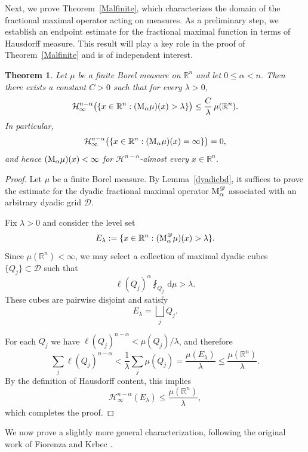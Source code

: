 \documentclass[11pt, a4paper, reqno]{amsart}
\newcommand{\R}{\mathbb R}
\newcommand{\Dy}{\mathscr D}
\newcommand{\Haus}{\mathcal H }
\newcommand{\dmu}{\,{\mathrm d\mu}}
\newtheorem{theorem}{Theorem}[section]
\theoremstyle{definition}
\theoremstyle{remark}
\begin{document}
Next, we prove Theorem~\ref{Malfinite}, which characterizes the domain of the fractional maximal operator acting on measures. As a preliminary step, we establish an endpoint estimate for the fractional maximal function in terms of Hausdorff measure. This result will play a key role in the proof of Theorem~\ref{Malfinite} and is of independent interest.

\begin{theorem}\label{weakHaus}
Let $\mu$ be a finite Borel measure on $\R^n$ and let $0 \le \alpha < n$. Then there exists a constant $C>0$ such that for every $\lambda>0$,
\[
\Haus_\infty^{n-\alpha}\bigl(\{x \in \R^n : (\textup{M}_\alpha \mu)(x) > \lambda\}\bigr)
\le \frac{C}{\lambda}\,\mu(\R^n).
\]
In particular,
\[
\Haus_\infty^{n-\alpha}\bigl(\{x \in \R^n : (\textup{M}_\alpha \mu)(x) = \infty\}\bigr) = 0,
\]
and hence $(\textup{M}_\alpha \mu)(x) < \infty$ for $\Haus^{n-\alpha}$-almost every $x \in \R^n$.
\end{theorem}



\begin{proof}
Let $\mu$ be a finite Borel measure. By Lemma~\ref{dyadicbd}, it suffices to prove the estimate for the dyadic fractional maximal operator $\textup{M}_\alpha^{\Dy}$ associated with an arbitrary dyadic grid $\Dy$.

Fix $\lambda>0$ and consider the level set
\[
E_\lambda := \{x\in\R^n : (\textup{M}_\alpha^{\Dy}\mu)(x) > \lambda\}.
\]
Since $\mu(\R^n)<\infty$, we may select a collection of maximal dyadic cubes $\{Q_j\}\subset\Dy$ such that
\[
\ell(Q_j)^\alpha \fint_{Q_j} \dmu > \lambda.
\]
These cubes are pairwise disjoint and satisfy
\[
E_\lambda = \bigsqcup_j Q_j.
\]

For each $Q_j$ we have $\ell(Q_j)^{n-\alpha} < \mu(Q_j)/\lambda$, and therefore
\[
\sum_j \ell(Q_j)^{n-\alpha}
< \frac{1}{\lambda}\sum_j \mu(Q_j)
= \frac{\mu(E_\lambda)}{\lambda}
\le \frac{\mu(\R^n)}{\lambda}.
\]
By the definition of Hausdorff content, this implies
\[
\Haus_\infty^{n-\alpha}(E_\lambda)
\le \frac{\mu(\R^n)}{\lambda},
\]
which completes the proof.
\end{proof}

We now prove a slightly more general characterization, following the original work of 
 Fiorenza and Krbec \cite{FK}. 
\end{document}
